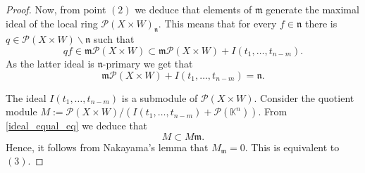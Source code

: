 \documentclass[10pt,a4paper]{amsart}
\newcommand{\K}{\mathbb{K}}
\newcommand{\PP}{\mathcal{P}}
\begin{document}
\begin{proof}
Now, from point $(2)$ we deduce that elements of $\mathfrak{m}$ generate the maximal ideal of the local ring $\PP(X\times W)_{\mathfrak{n}}$. This means that for every $f\in\mathfrak{n}$ there is $q\in\PP(X\times W)\backslash\mathfrak{n}$ such that
\begin{equation*}
	qf\in \mathfrak{m}\PP(X\times W)\subset \mathfrak{m}\PP(X\times W) +I(t_1,\dots,t_{n-m}).
\end{equation*}
As the latter ideal is $\mathfrak{n}$-primary we get that 
\begin{equation}\label{ideal_equal_eq}
	\mathfrak{m}\PP(X\times W) +I(t_1,\dots,t_{n-m})=\mathfrak{n}.
\end{equation}

The ideal $I(t_1,\dots,t_{n-m})$ is a submodule of $\PP(X\times W)$. Consider the quotient module $M:=\PP(X\times W)/(I(t_1,\dots,t_{n-m})+\PP(\K^n))$. From \eqref{ideal_equal_eq} we deduce that 
\begin{equation*}
	M\subset M\mathfrak{m}.
\end{equation*}
Hence, it follows from Nakayama's lemma that $M_{\mathfrak{m}}=0$. This is equivalent to $(3)$.
\end{proof}
\end{document}
